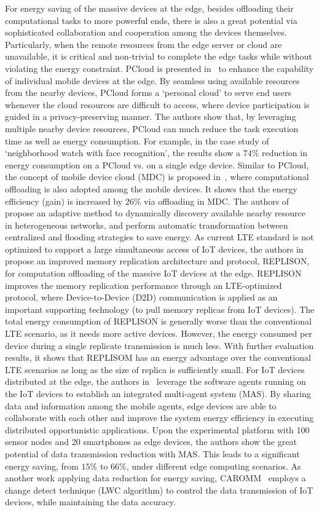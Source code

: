 For energy saving of the massive devices at the edge, besides offloading their computational tasks to more powerful ends, there is also a great potential via sophisticated collaboration and cooperation among the devices themselves. Particularly, when the remote resources from the edge server or cloud are unavailable, it is critical and non-trivial to complete the edge tasks while without violating the energy constraint.
PCloud is presented in~ to enhance the capability of individual mobile devices at the edge. By seamless using available resources from the nearby devices, PCloud forms a ‘personal cloud’ to serve end users whenever the cloud resources are difficult to access, where device participation is guided in a privacy-preserving manner. The authors show that, by leveraging multiple nearby device resources, PCloud can much reduce the task execution time as well as energy consumption. For example, in the case study of ‘neighborhood watch with face recognition’, the results show a $74\%$ reduction in energy consumption on a PCloud vs. on a single edge device. Similar to PCloud, the concept of mobile device cloud (MDC) is proposed in~, where computational offloading is also adopted among the mobile devices. It shows that the energy efficiency (gain) is increased by $26\%$ via offloading in MDC. The authors of~ propose an adaptive method to dynamically discovery available nearby resource in heterogeneous networks, and perform automatic transformation between centralized and flooding strategies to save energy.
As current LTE standard is not optimized to support a large simultaneous access of IoT devices, the authors in~ propose an improved memory replication architecture and protocol, REPLISON, for computation offloading of the massive IoT devices at the edge. REPLISON improves the memory replication performance through an LTE-optimized protocol, where Device-to-Device (D2D) communication is applied as an important supporting technology (to pull memory replicas from IoT devices). The total energy consumption of REPLISON is generally worse than the conventional LTE scenario, as it needs more active devices. However, the energy consumed per device during a single replicate transmission is much less. With further evaluation results, it shows that REPLISOM has an energy advantage over the conventional LTE scenarios as long as the size of replica is sufficiently small.
For IoT devices distributed at the edge, the authors in~ leverage the software agents running on the IoT devices to establish an integrated multi-agent system (MAS). By sharing data and information among the mobile agents, edge devices are able to collaborate with each other and improve the system energy efficiency in executing distributed opportunistic applications. Upon the experimental platform with 100 sensor nodes and 20 smartphones as edge devices, the authors show the great potential of data transmission reduction with MAS. This leads to a significant energy saving, from $15\%$ to $66\%$, under different edge computing scenarios. As another work applying data reduction for energy saving, CAROMM~ employs a change detect technique (LWC algorithm) to control the data transmission of IoT devices, while maintaining the data accuracy.

